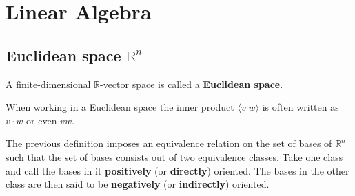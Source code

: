\chapter{Linear Algebra}\label{chapter:linear_algebra}






\section{Euclidean space \texorpdfstring{$\mathbb{R}^n$}\ }

    A finite-dimensional $\mathbb{R}$-vector space is called a \textbf{Euclidean space}.

    \begin{notation}
        When working in a Euclidean space the inner product $\langle v|w\rangle$ is often written as $v\cdot w$ or even $vw$.
    \end{notation}

    \begin{result}
        The previous definition imposes an equivalence relation on the set of bases of $\mathbb{R}^n$ such that the set of bases consists out of two equivalence classes. Take one class and call the bases in it \textbf{positively} (or \textbf{directly}) oriented. The bases in the other class are then said to be \textbf{negatively} (or \textbf{indirectly}) oriented.
    \end{result}
